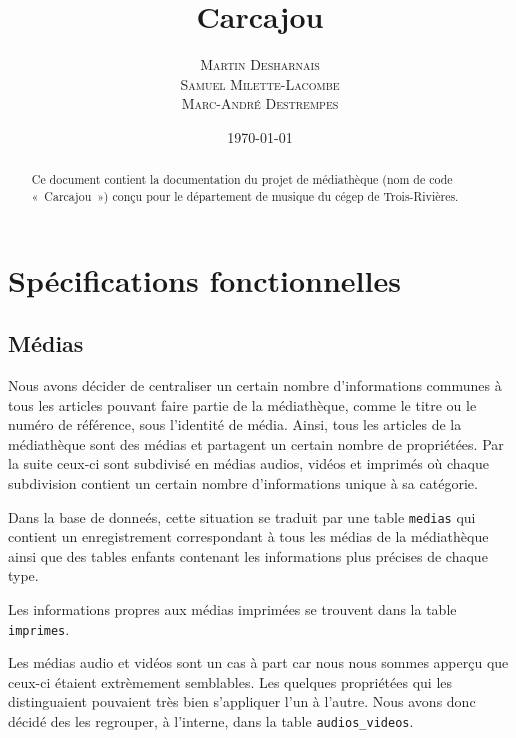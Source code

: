 \documentclass[letter, 11pt]{report}
\begin{document}
\title{Carcajou}
\author{\textsc{Martin Desharnais} \\ \textsc{Samuel Milette-Lacombe} \\ \textsc{Marc-André Destrempes}}
\date{\today}

\maketitle

\begin{abstract}
Ce document contient la documentation du projet de médiathèque (nom de code «~Carcajou~») conçu pour le département de musique du cégep de Trois-Rivières.
\end{abstract}

\newpage
\tableofcontents
\newpage

\chapter{Spécifications fonctionnelles}


\section{Médias}

Nous avons décider de centraliser un certain nombre d'informations communes à tous les articles pouvant faire partie de la médiathèque, comme le titre ou le numéro de référence, sous l'identité de média. Ainsi, tous les articles de la médiathèque sont des médias et partagent un certain nombre de propriétées. Par la suite ceux-ci sont subdivisé en médias audios, vidéos et imprimés où chaque subdivision contient un certain nombre d'informations unique à sa catégorie.

Dans la base de donneés, cette situation se traduit par une table \texttt{medias} qui contient un enregistrement correspondant à tous les médias de la médiathèque ainsi que des tables enfants contenant les informations plus précises de chaque type.

Les informations propres aux médias imprimées se trouvent dans la table \texttt{imprimes}.

Les médias audio et vidéos sont un cas à part car nous nous sommes apperçu que ceux-ci étaient extrèmement semblables. Les quelques propriétées qui les distinguaient pouvaient très bien s'appliquer l'un à l'autre. Nous avons donc décidé des les regrouper, à l'interne, dans la table \texttt{audios\_videos}.
\end{document}
